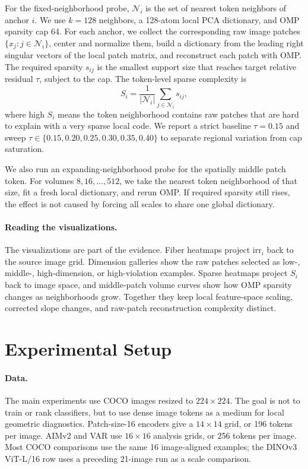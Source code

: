 \documentclass{article}
\newcommand{\dataset}[1]{\textsc{#1}}
\newcommand{\irr}{\mathrm{irr}}
\begin{document}
For the fixed-neighborhood probe, $\mathcal{N}_i$ is the set of nearest token neighbors of anchor $i$. We use $k=128$ neighbors, a 128-atom local PCA dictionary, and OMP sparsity cap 64. For each anchor, we collect the corresponding raw image patches $\{x_j:j\in\mathcal{N}_i\}$, center and normalize them, build a dictionary from the leading right singular vectors of the local patch matrix, and reconstruct each patch with OMP. The required sparsity $s_{ij}$ is the smallest support size that reaches target relative residual $\tau$, subject to the cap. The token-level sparse complexity is
\begin{equation}
  S_i=\frac{1}{|\mathcal{N}_i|}\sum_{j\in\mathcal{N}_i} s_{ij},
\end{equation}
where high $S_i$ means the token neighborhood contains raw patches that are hard to explain with a very sparse local code. We report a strict baseline $\tau=0.15$ and sweep $\tau\in\{0.15,0.20,0.25,0.30,0.35,0.40\}$ to separate regional variation from cap saturation.

We also run an expanding-neighborhood probe for the spatially middle patch token. For volumes $8,16,\ldots,512$, we take the nearest token neighborhood of that size, fit a fresh local dictionary, and rerun OMP. If required sparsity still rises, the effect is not caused by forcing all scales to share one global dictionary.

\paragraph{Reading the visualizations.}
The visualizations are part of the evidence. Fiber heatmaps project $\irr_i$ back to the source image grid. Dimension galleries show the raw patches selected as low-, middle-, high-dimension, or high-violation examples. Sparse heatmaps project $S_i$ back to image space, and middle-patch volume curves show how OMP sparsity changes as neighborhoods grow. Together they keep local feature-space scaling, corrected slope changes, and raw-patch reconstruction complexity distinct.

\section{Experimental Setup}
\paragraph{Data.}
The main experiments use \dataset{COCO} images resized to $224\times224$. The goal is not to train or rank classifiers, but to use dense image tokens as a medium for local geometric diagnostics. Patch-size-16 encoders give a $14\times14$ grid, or 196 tokens per image. AIMv2 and VAR use $16\times16$ analysis grids, or 256 tokens per image. Most \dataset{COCO} comparisons use the same 16 image-aligned examples; the DINOv3 ViT-L/16 row uses a preceding 21-image run as a scale comparison.
\end{document}
